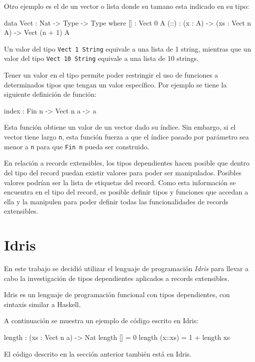 Otro ejemplo es el de un vector o lista donde su tamano esta indicado en su tipo:

\begin{code}
data Vect : Nat -> Type -> Type where
  [] : Vect 0 A
  (::) : (x : A) -> (xs : Vect n A) -> Vect (n + 1) A
\end{code}

Un valor del tipo \texttt{Vect 1 String} equivale a una lista de 1 string, mientras que un valor del tipo \texttt{Vect 10 String} equivale a una lista de 10 strings.

Tener un valor en el tipo permite poder restringir el uso de funciones a determinados tipos que tengan un valor específico. Por ejemplo se tiene la siguiente definición de función:
\begin{code}
index : Fin n -> Vect n a -> a
\end{code}

Esta función obtiene un valor de un vector dado su índice. Sin embargo, si el vector tiene largo \texttt{n}, esta función fuerza a que el índice pasado por parámetro sea menor a \texttt{n} para que \texttt{Fin n} pueda ser construido.

En relación a records extensibles, los tipos dependientes hacen posible que dentro del tipo del record puedan existir valores para poder ser manipulados. Posibles valores podrían ser la lista de etiquetas del record. Como esta información se encuentra en el tipo del record, es posible definir tipos y funciones que accedan a ella y la manipulen para poder definir todas las funcionalidades de records extensibles.

\section{Idris}

En este trabajo se decidió utilizar el lenguaje de programación \textit{Idris} para llevar a cabo la investigación de tipos dependientes aplicados a records extensibles.

Idris es un lenguaje de programación funcional con tipos dependientes, con sintaxis similar a Haskell.

A continuación se muestra un ejemplo de código escrito en Idris:
\begin{code}
length : (xs : Vect n a) -> Nat
length [] = 0
length (x::xs) = 1 + length xs
\end{code}

El código descrito en la sección anterior también está en Idris.

